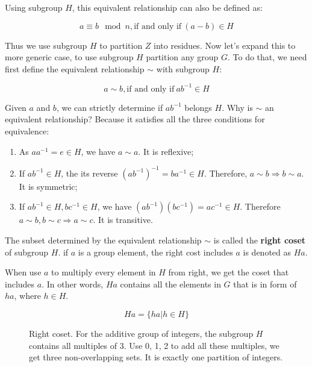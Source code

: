 \documentclass{article}
\begin{document}
Using subgroup $H$, this equivalent relationship can also be defined as:

\[
a \equiv b \mod n, \text{if and only if}\ (a - b) \in H
\]

Thus we use subgroup $H$ to partition $Z$ into residues. Now let's expand this to more generic case, to use subgroup $H$ partition any group $G$. To do that, we need first define the equivalent relationship $\sim$ with subgroup $H$:

\[
a \sim b, \text{if and only if}\ ab^{-1} \in H
\]

Given $a$ and $b$, we can strictly determine if $ab^{-1}$ belongs $H$. Why is $\sim$ an equivalent relationship? Because it satisfies all the three conditions for equivalence:

\begin{enumerate}
\item As $aa^{-1} = e \in H$, we have $a \sim a$. It is reflexive;
\item If $ab^{-1} \in H$, the its reverse $(ab^{-1})^{-1}= ba^{-1} \in H$. Therefore, $a \sim b \Rightarrow b \sim a$. It is symmetric;
\item If $ab^{-1} \in H, bc^{-1} \in H$, we have $(ab^{-1})(bc^{-1}) = ac^{-1} \in H$. Therefore $a \sim b, b \sim c \Rightarrow a \sim c$. It is transitive.
\end{enumerate}

\begin{definition}
The subset determined by the equivalent relationship $\sim$ is called the \textbf{right coset} of subgroup $H$. if $a$ is a group element, the right cost includes $a$ is denoted as $Ha$.
\end{definition}

When use $a$ to multiply every element in $H$ from right, we get the coset that includes $a$. In other words, $Ha$ contains all the elements in $G$ that is in form of $ha$, where $h \in H$.

\[
Ha = \{ha | h \in H\}
\]

\begin{figure}[htbp]
\centering
{}
\caption{Right coset. For the additive group of integers, the subgroup $H$ contains all multiples of 3. Use 0, 1, 2 to add all these multiples, we get three non-overlapping sets. It is exactly one partition of integers.}
\label{fig:right-cosets-Z3}
\end{figure}
\end{document}
